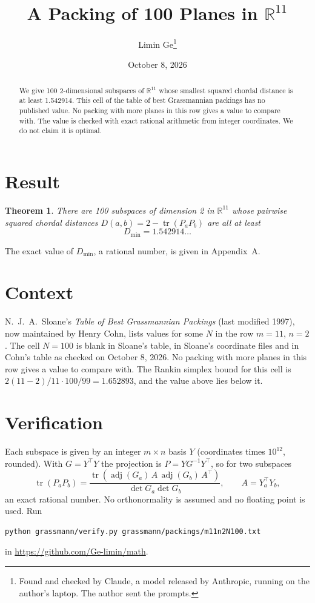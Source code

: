 \documentclass[11pt,a4paper]{article}
\title{A Packing of 100 Planes in $\mathbb{R}^{11}$}
\author{Limin Ge\thanks{Found and checked by Claude, a model released by Anthropic, running on the author's laptop. The author sent the prompts.}}
\date{October 8, 2026}
\newtheorem*{theorem}{Theorem}
\begin{document}
\maketitle
\begin{abstract}
We give 100 2-dimensional subspaces of $\mathbb{R}^{11}$ whose smallest squared chordal distance is at least 1.542914. This cell of the table of best Grassmannian packings has no published value. No packing with more planes in this row gives a value to compare with. The value is checked with exact rational arithmetic from integer coordinates. We do not claim it is optimal.
\end{abstract}

\section{Result}
\begin{theorem}
There are 100 subspaces of dimension 2 in $\mathbb{R}^{11}$ whose pairwise squared chordal distances $D(a,b) = 2 - \operatorname{tr}(P_aP_b)$ are all at least
\[ D_{\min} = 1.542914\ldots \]
\end{theorem}
The exact value of $D_{\min}$, a rational number, is given in Appendix~A.


\section{Context}
N.~J.~A.~Sloane's \emph{Table of Best Grassmannian Packings} (last modified 1997), now maintained by Henry Cohn, lists values for some $N$ in the row $m=11$, $n=2$. The cell $N=100$ is blank in Sloane's table, in Sloane's coordinate files and in Cohn's table as checked on October 8, 2026. No packing with more planes in this row gives a value to compare with. The Rankin simplex bound for this cell is $2(11-2)/11\cdot 100/99 = 1.652893$, and the value above lies below it.


\section{Verification}
Each subspace is given by an integer $m\times n$ basis $Y$ (coordinates times $10^{12}$, rounded). With $G=Y^\top Y$ the projection is $P=YG^{-1}Y^\top$, so for two subspaces
\[ \operatorname{tr}(P_aP_b)=\frac{\operatorname{tr}(\operatorname{adj}(G_a)\,A\,\operatorname{adj}(G_b)\,A^\top)}{\det G_a\det G_b},\qquad A=Y_a^\top Y_b, \]
an exact rational number. No orthonormality is assumed and no floating point is used. Run
\begin{verbatim}
python grassmann/verify.py grassmann/packings/m11n2N100.txt
\end{verbatim}
in \url{https://github.com/Ge-limin/math}.
\end{document}

